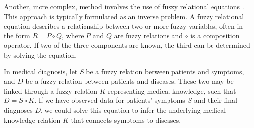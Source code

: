 Another, more complex, method involves the use of fuzzy relational equations \cite[Sec.~3.5]{HistoryFL2017}. This approach is typically formulated as an inverse problem. A fuzzy relational equation describes a relationship between two or more fuzzy variables, often in the form $R = P \circ Q$, where $P$ and $Q$ are fuzzy relations and $\circ$ is a composition operator. If two of the three components are known, the third can be determined by solving the equation.

\begin{example}
    In medical diagnosis, let $S$ be a fuzzy relation between patients and symptoms, and $D$ be a fuzzy relation between patients and diseases. These two may be linked through a fuzzy relation $K$ representing medical knowledge, such that $D = S \circ K$. If we have observed data for patients' symptoms $S$ and their final diagnoses $D$, we could solve this equation to infer the underlying medical knowledge relation $K$ that connects symptoms to diseases.
\end{example}